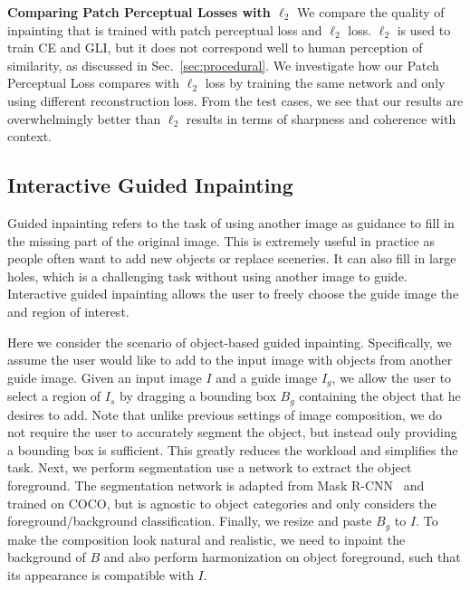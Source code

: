 \noindent\textbf{Comparing Patch Perceptual Losses with $\ell_2$} We compare the quality of inpainting that is trained with patch perceptual loss and $\ell_2$ loss. $\ell_2$ is used to train CE and GLI, but it does not correspond well to human perception of similarity, as discussed in Sec.~\ref{sec:procedural}. We investigate how our Patch Perceptual Loss compares with $\ell_2$ loss by training the same network and only using different reconstruction loss. From the test cases, we see that our results are overwhelmingly better than $\ell_2$ results in terms of sharpness and coherence with context.

\subsection{Interactive Guided Inpainting}
\label{exp:guided} 

Guided inpainting refers to the task of using another image as guidance to fill in the missing part of the original image. This is extremely useful in practice as people often want to add new objects or replace sceneries. It can also fill in large holes, which is a challenging task without using another image to guide. Interactive guided inpainting allows the user to freely choose the guide image the and region of interest.

Here we consider the scenario of object-based guided inpainting. Specifically, we assume the user would like to add to the input image with objects from another guide image. Given an input image $I$ and a guide image $I_g$, we allow the user to select a region of $I_s$ by dragging a bounding box $B_g$ containing the object that he desires to add. Note that unlike previous settings of image composition, we do not require the user to accurately segment the object, but instead only providing a bounding box is sufficient. This greatly reduces the workload and simplifies the task. Next, we perform segmentation use a network to extract the object foreground. The segmentation network is adapted from Mask R-CNN~\cite{he2017mask} and trained on COCO, but is agnostic to object categories and only considers the foreground/background classification. Finally, we resize and paste $B_g$ to $I$. To make the composition look natural and realistic, we need to inpaint the background of $B$ and also perform harmonization on object foreground, such that its appearance is compatible with $I$.   

